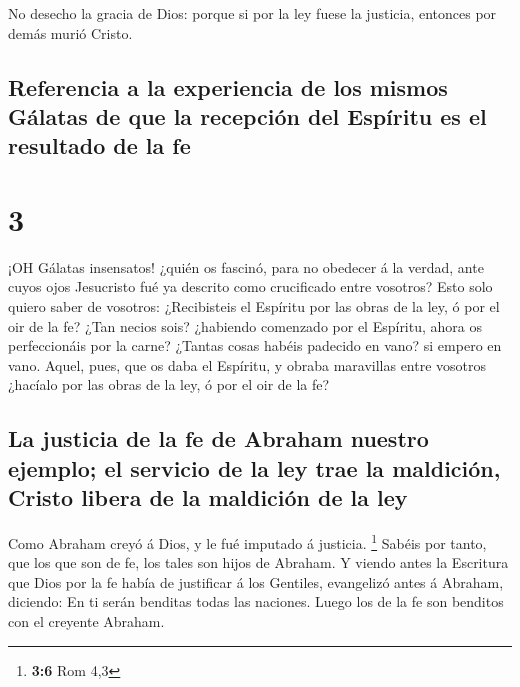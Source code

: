  No desecho la gracia de Dios: porque si por la ley fuese
la justicia, entonces por demás murió Cristo.

\hypertarget{referencia-a-la-experiencia-de-los-mismos-guxe1latas-de-que-la-recepciuxf3n-del-espuxedritu-es-el-resultado-de-la-fe}{%
\subsection{Referencia a la experiencia de los mismos Gálatas de que la
recepción del Espíritu es el resultado de la
fe}\label{referencia-a-la-experiencia-de-los-mismos-guxe1latas-de-que-la-recepciuxf3n-del-espuxedritu-es-el-resultado-de-la-fe}}

\hypertarget{section-2}{%
\section{3}\label{section-2}}

 ¡OH Gálatas insensatos! ¿quién os fascinó, para no obedecer
á la verdad, ante cuyos ojos Jesucristo fué ya descrito como crucificado
entre vosotros?  Esto solo quiero saber de vosotros:
¿Recibisteis el Espíritu por las obras de la ley, ó por el oir de la fe?
 ¿Tan necios sois? ¿habiendo comenzado por el Espíritu,
ahora os perfeccionáis por la carne?  ¿Tantas cosas habéis
padecido en vano? si empero en vano.  Aquel, pues, que os
daba el Espíritu, y obraba maravillas entre vosotros ¿hacíalo por las
obras de la ley, ó por el oir de la fe?

\hypertarget{la-justicia-de-la-fe-de-abraham-nuestro-ejemplo-el-servicio-de-la-ley-trae-la-maldiciuxf3n-cristo-libera-de-la-maldiciuxf3n-de-la-ley}{%
\subsection{La justicia de la fe de Abraham nuestro ejemplo; el servicio
de la ley trae la maldición, Cristo libera de la maldición de la
ley}\label{la-justicia-de-la-fe-de-abraham-nuestro-ejemplo-el-servicio-de-la-ley-trae-la-maldiciuxf3n-cristo-libera-de-la-maldiciuxf3n-de-la-ley}}

 Como Abraham creyó á Dios, y le fué imputado á justicia.
\footnote{\textbf{3:6} Rom 4,3}  Sabéis por tanto, que los
que son de fe, los tales son hijos de Abraham.  Y viendo
antes la Escritura que Dios por la fe había de justificar á los
Gentiles, evangelizó antes á Abraham, diciendo: En ti serán benditas
todas las naciones.  Luego los de la fe son benditos con el
creyente Abraham.

